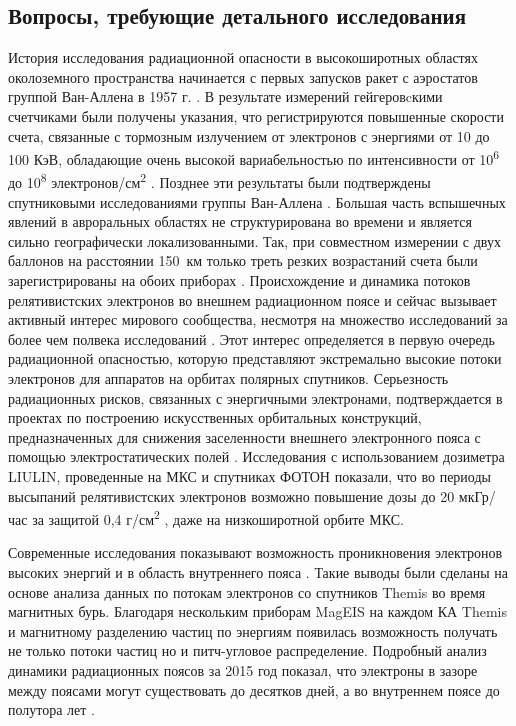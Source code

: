 \subsection{Вопросы, требующие детального исследования}
История исследования радиационной опасности в высокоширотных областях околоземного пространства начинается с первых запусков ракет с аэростатов группой Ван-Аллена в 1957 г. \cite{Brown1966}. В результате измерений гейгеровcкими счетчиками были получены указания, что регистрируются повышенные скорости счета, связанные с тормозным излучением от электронов с энергиями от 10 до 100 КэВ, обладающие очень высокой вариабельностью по интенсивности от 10\textsuperscript{6} до 10\textsuperscript{8} электронов/см\textsuperscript{2} \cite{Brown1966}. Позднее эти результаты были подтверждены спутниковыми исследованиями группы Ван-Аллена \cite{Brown1966}. Большая часть вспышечных явлений в авроральных областях не структурирована во времени и является сильно географически локализованными. Так, при совместном измерении с двух баллонов на расстоянии 150~км только треть резких возрастаний счета были зарегистрированы на обоих приборах \cite{Brown1966}.
Происхождение и динамика потоков релятивистских электронов во внешнем радиационном поясе и сейчас вызывает активный интерес мирового сообщества, несмотря на множество исследований  за более чем полвека исследований \cite{Gussenhoven1997,Borovsky2010,Holeman1991,Miyoshi2011,Chen2016,Turner2013,Brautigam2001,Borovsky2010a,Gussenhoven1995,Borovsky2011,Baker2013,Mullen1998,Chen2014,Morley2010,Potapov2014,Denton2010}. Этот интерес определяется в первую очередь радиационной опасностью, которую представляют экстремально высокие потоки электронов для аппаратов на орбитах полярных спутников. Серьезность радиационных рисков, связанных с энергичными электронами, подтверждается в проектах по построению искусственных орбитальных конструкций, предназначенных для снижения заселенности внешнего электронного пояса с помощью электростатических полей \cite{Hoyt2007}. Исследования с использованием дозиметра LIULIN, проведенные на МКС и спутниках ФОТОН показали, что во периоды высыпаний релятивистских электронов возможно повышение дозы до 20 мкГр/час за защитой 0,4 г/см\textsuperscript{2} \cite{Dachev2009}, даже на низкоширотной орбите МКС. 

Современные исследования показывают возможность проникновения электронов высоких энергий и в область внутреннего пояса \cite{Claudepierre2017}. Такие выводы были сделаны на основе анализа данных по потокам электронов со спутников Themis во время магнитных бурь. Благодаря нескольким приборам MagEIS  на каждом КА Themis и магнитному разделению частиц по энергиям появилась возможность получать не только потоки частиц но и питч-угловое распределение. Подробный анализ динамики радиационных поясов за 2015 год показал, что электроны в зазоре между поясами могут существовать до десятков дней, а во внутреннем поясе до полутора лет \cite{Claudepierre2017}. 

